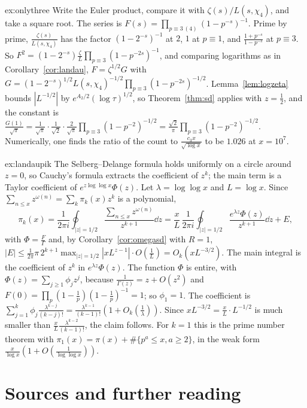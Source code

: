 \begin{solution}{ex:onlythree}
\idea Write the Euler product, compare it with $\zeta(s)/L(s,\chi_4)$, and take a square root.
\writeup The series is $F(s)=\prod_{p\equiv3\ (4)}(1-p^{-s})^{-1}$. Prime by prime, $\frac{\zeta(s)}{L(s,\chi_4)}$ has the factor $(1-2^{-s})^{-1}$ at $2$, $1$ at $p\equiv1$, and $\frac{1+p^{-s}}{1-p^{-s}}$ at $p\equiv3$. So $F^2=(1-2^{-s})\frac\zeta L\prod_{p\equiv3}(1-p^{-2s})^{-1}$, and comparing logarithms as in Corollary~\ref{cor:landau}, $F=\zeta^{1/2}G$ with $G=(1-2^{-s})^{1/2}L(s,\chi_4)^{-1/2}\prod_{p\equiv3}(1-p^{-2s})^{-1/2}$. Lemma~\ref{lem:logzeta} bounds $|L^{-1/2}|$ by $e^{A_2/2}(\log\tau)^{1/2}$, so Theorem~\ref{thm:sd} applies with $z=\frac12$, and the constant is $\frac{G(1)}{\sqrt\pi}=\frac1{\sqrt\pi}\cdot\frac1{\sqrt2}\cdot\frac2{\sqrt\pi}\prod_{p\equiv3}(1-p^{-2})^{-1/2}=\frac{\sqrt2}\pi\prod_{p\equiv3}(1-p^{-2})^{-1/2}$. Numerically, one finds the ratio of the count to $\frac{c_3x}{\sqrt{\log x}}$ to be $1.026$ at $x=10^7$.
\end{solution}

\begin{solution}{ex:landaupik}
\idea The Selberg--Delange formula holds uniformly on a circle around $z=0$, so Cauchy's formula extracts the coefficient of $z^k$; the main term is a Taylor coefficient of $e^{z\log\log x}\Phi(z)$.
\writeup Let $\lambda=\log\log x$ and $L=\log x$. Since $\sum_{n\le x}z^{\omega(n)}=\sum_k\pi_k(x)z^k$ is a polynomial,
\[
\pi_k(x)=\frac1{2\pi i}\oint_{|z|=1/2}\frac{\sum_{n\le x}z^{\omega(n)}}{z^{k+1}}\dd z=\frac xL\,\frac1{2\pi i}\oint_{|z|=1/2}\frac{e^{\lambda z}\Phi(z)}{z^{k+1}}\dd z+E,
\]
with $\Phi=\frac F\Gamma$ and, by Corollary~\ref{cor:omegasd} with $R=1$, $|E|\le\frac1{2\pi}\pi\,2^{k+1}\max_{|z|=1/2}|xL^{z-1}|\cdot O(\frac1L)=O_k(xL^{-3/2})$. The main integral is the coefficient of $z^k$ in $e^{\lambda z}\Phi(z)$. The function $\Phi$ is entire, with $\Phi(z)=\sum_{j\ge1}\phi_jz^j$, because $\frac1{\Gamma(z)}=z+O(z^2)$ and $F(0)=\prod_p(1-\frac1p)(1-\frac1p)^{-1}=1$; so $\phi_1=1$. The coefficient is $\sum_{j=1}^k\phi_j\frac{\lambda^{k-j}}{(k-j)!}=\frac{\lambda^{k-1}}{(k-1)!}(1+O_k(\frac1\lambda))$. Since $xL^{-3/2}=\frac xL\cdot L^{-1/2}$ is much smaller than $\frac xL\frac{\lambda^{k-2}}{(k-1)!}$, the claim follows. For $k=1$ this is the prime number theorem with $\pi_1(x)=\pi(x)+\#\{p^a\le x,a\ge2\}$, in the weak form $\frac x{\log x}(1+O(\frac1{\log\log x}))$.
\end{solution}

\section*{Sources and further reading}

